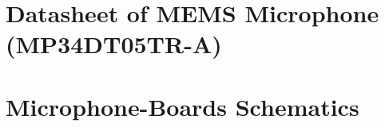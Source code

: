 \section{Datasheet of MEMS Microphone (MP34DT05TR-A)} \label{appendix_datasheet_microphone}
\enlargethispage{2.5cm}
\begin{adjustwidth}{0.23cm}{0cm} \hfuzz=7.0pt \vfuzz=19.0pt
\end{adjustwidth}
\newpage


\section{Microphone-Boards Schematics} \label{appendix_schematics_microphone_boards}
\enlargethispage{2.5cm}
\begin{adjustwidth}{-0.23cm}{0cm} \hfuzz=7.0pt \vfuzz=20.0pt
\end{adjustwidth}
\newpage

